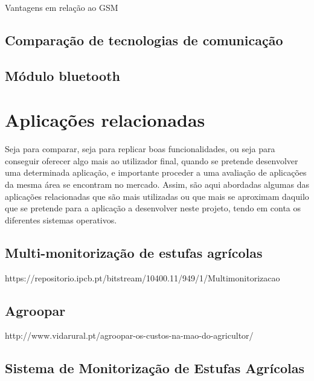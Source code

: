 Vantagens em relação ao GSM


\subsection{Comparação de tecnologias de comunicação}





\subsection{Módulo bluetooth}







\newpage
\section{Aplicações relacionadas}



Seja para comparar, seja para replicar boas funcionalidades, ou seja para conseguir oferecer algo mais ao utilizador final, quando se pretende desenvolver uma determinada aplicação, e
importante proceder a uma avaliação de aplicações da mesma área se encontram no mercado.
Assim, são aqui abordadas algumas das aplicações relacionadas que são mais utilizadas ou que mais se aproximam daquilo que se pretende para a aplicação a desenvolver neste projeto,
tendo em conta os diferentes sistemas operativos.



\subsection{Multi-monitorização de estufas agrícolas }

https://repositorio.ipcb.pt/bitstream/10400.11/949/1/Multimonitorizacao%

\subsection{Agroopar}

http://www.vidarural.pt/agroopar-os-custos-na-mao-do-agricultor/


\subsection{Sistema de Monitorização de Estufas Agrícolas}


\cite{Abreu2012}


\newpage









